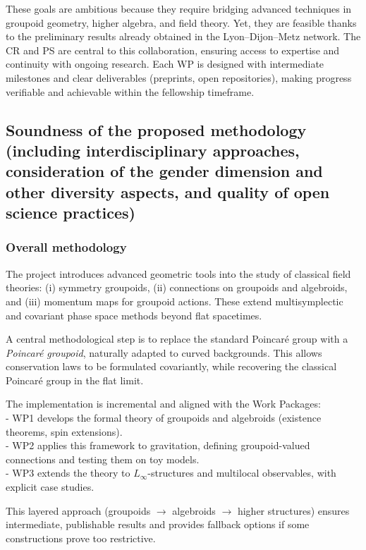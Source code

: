 \documentclass[11pt]{msca-pf}
\begin{document}
These goals are ambitious because they require bridging advanced techniques in groupoid geometry, higher algebra, and field theory. Yet, they are feasible thanks to the preliminary results already obtained in the Lyon–Dijon–Metz network. The CR and PS are central to this collaboration, ensuring access to expertise and continuity with ongoing research. Each WP is designed with intermediate milestones and clear deliverables (preprints, open repositories), making progress verifiable and achievable within the fellowship timeframe.




\subsection{Soundness of the proposed methodology
    (including interdisciplinary approaches, consideration of the gender
    dimension and other diversity aspects, and quality of open science practices) 
}
\label{ssc:excellence: methodology}


\subsubsection*{Overall methodology}
The project introduces advanced geometric tools into the study of classical field theories: (i) symmetry groupoids, (ii) connections on groupoids and algebroids, and (iii) momentum maps for groupoid actions. These extend multisymplectic and covariant phase space methods beyond flat spacetimes.  

A central methodological step is to replace the standard Poincaré group with a \emph{Poincaré groupoid}, naturally adapted to curved backgrounds. This allows conservation laws to be formulated covariantly, while recovering the classical Poincaré group in the flat limit.  

The implementation is incremental and aligned with the Work Packages: \\ 
- WP1 develops the formal theory of groupoids and algebroids (existence theorems, spin extensions).\\  
- WP2 applies this framework to gravitation, defining groupoid-valued connections and testing them on toy models.\\ 
- WP3 extends the theory to $L_\infty$-structures and multilocal observables, with explicit case studies.  

This layered approach (groupoids $\to$ algebroids $\to$ higher structures) ensures intermediate, publishable results and provides fallback options if some constructions prove too restrictive.  
\end{document}

